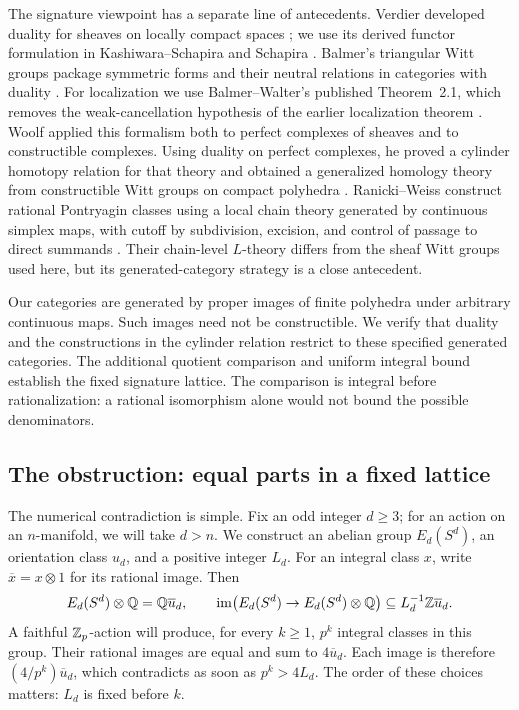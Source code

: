 The signature viewpoint has a separate line of antecedents.
Verdier developed duality for sheaves on locally compact spaces
\cite{Verdier1966}; we use its derived functor formulation in
Kashiwara--Schapira and Schapira
\cite{KashiwaraSchapira1990,SchapiraNotes}.
Balmer's triangular Witt groups package symmetric forms and their
neutral relations in categories with duality \cite{Balmer2000}.
For localization we use Balmer--Walter's published
Theorem~2.1, which removes the weak-cancellation hypothesis of the
earlier localization theorem \cite{BalmerWalter2002}.
Woolf applied this formalism both to perfect complexes of sheaves and
to constructible complexes. Using duality on perfect complexes, he
proved a cylinder homotopy relation for that theory and obtained a
generalized homology theory from constructible Witt groups on compact
polyhedra
\cite{Woolf2008}.
Ranicki--Weiss construct rational Pontryagin classes using a local
chain theory generated by continuous simplex maps, with cutoff by
subdivision, excision, and control of passage to direct summands
\cite[\S4 and Theorems~8.2--8.3]{RanickiWeiss2010}.
Their chain-level $L$-theory differs from the sheaf Witt groups used
here, but its generated-category strategy is a close antecedent.

Our categories are generated by proper images of finite polyhedra under
arbitrary continuous maps. Such images need not be constructible.
We verify that duality and the constructions in the cylinder relation
restrict to these specified generated categories. The additional
quotient comparison and uniform integral bound establish the fixed
signature lattice.
The comparison is integral before rationalization: a rational
isomorphism alone would not bound the possible denominators.

\subsection{The obstruction: equal parts in a fixed lattice}

The numerical contradiction is simple. Fix an odd integer
\(d\geq3\); for an action on an \(n\)-manifold, we will take \(d>n\).
We construct an abelian group \(E_d(S^d)\), an orientation
class \(u_d\), and a positive integer \(L_d\). For an integral class
\(x\), write \(\overline{x}=x\otimes1\) for its rational image. Then
\begin{equation}\label{intro:lattice}
 E_d(S^d)\otimes\mathbb Q=\mathbb Q\overline{u}_d,
 \qquad
 \operatorname{im}\bigl(E_d(S^d)\to E_d(S^d)\otimes\mathbb Q\bigr)
       \subseteq L_d^{-1}\mathbb Z\overline{u}_d.
\end{equation}
A faithful \(\mathbb Z_p\)-action will produce, for every \(k\geq1\),
\(p^k\) integral classes in this group. Their rational images are equal
and sum to \(4\overline{u}_d\). Each image is therefore
\((4/p^k)\overline{u}_d\), which
contradicts  as soon as \(p^k>4L_d\).
The order of these choices matters: \(L_d\) is fixed before \(k\).

